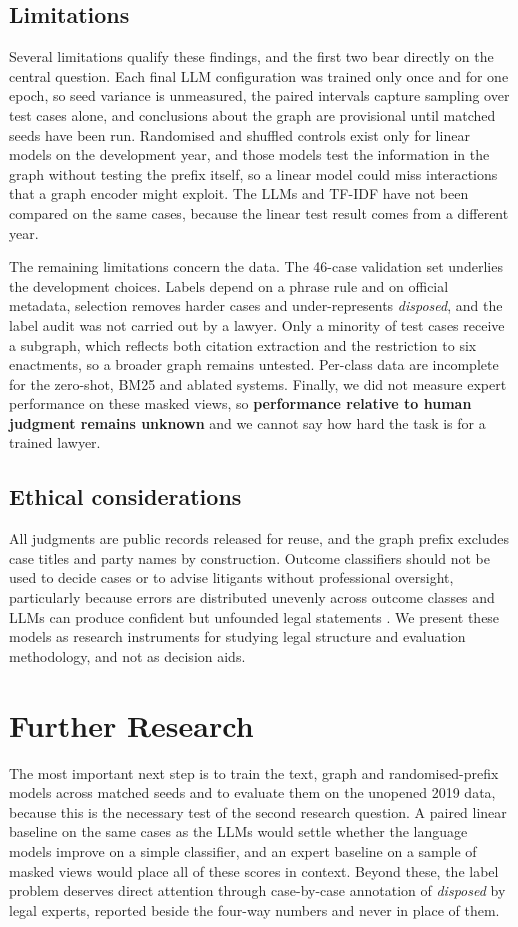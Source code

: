 \documentclass[11pt,a4paper]{article}
\newcommand{\cls}[1]{\emph{#1}}
\begin{document}
\subsection{Limitations}\label{sec:limits}
Several limitations qualify these findings, and the first two bear directly on the central question. Each final LLM configuration was trained only once and for one epoch, so seed variance is unmeasured, the paired intervals capture sampling over test cases alone, and conclusions about the graph are provisional until matched seeds have been run. Randomised and shuffled controls exist only for linear models on the development year, and those models test the information in the graph without testing the prefix itself, so a linear model could miss interactions that a graph encoder might exploit. The LLMs and TF-IDF have not been compared on the same cases, because the linear test result comes from a different year.

The remaining limitations concern the data. The 46-case validation set underlies the development choices. Labels depend on a phrase rule and on official metadata, selection removes harder cases and under-represents \cls{disposed}, and the label audit was not carried out by a lawyer. Only a minority of test cases receive a subgraph, which reflects both citation extraction and the restriction to six enactments, so a broader graph remains untested. Per-class data are incomplete for the zero-shot, BM25 and ablated systems. Finally, we did not measure expert performance on these masked views, so \textbf{performance relative to human judgment remains unknown} and we cannot say how hard the task is for a trained lawyer.

\subsection{Ethical considerations}
All judgments are public records released for reuse, and the graph prefix excludes case titles and party names by construction. Outcome classifiers should not be used to decide cases or to advise litigants without professional oversight, particularly because errors are distributed unevenly across outcome classes and LLMs can produce confident but unfounded legal statements \cite{r51}. We present these models as research instruments for studying legal structure and evaluation methodology, and not as decision aids.

\section{Further Research}\label{sec:future}
The most important next step is to train the text, graph and randomised-prefix models across matched seeds and to evaluate them on the unopened 2019 data, because this is the necessary test of the second research question. A paired linear baseline on the same cases as the LLMs would settle whether the language models improve on a simple classifier, and an expert baseline on a sample of masked views would place all of these scores in context. Beyond these, the label problem deserves direct attention through case-by-case annotation of \cls{disposed} by legal experts, reported beside the four-way numbers and never in place of them.
\end{document}
